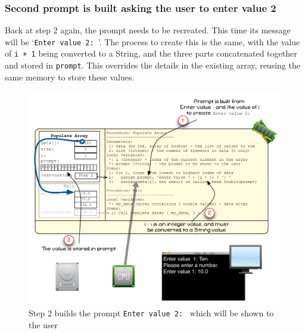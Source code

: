 
\clearpage
\subsubsection{Second prompt is built asking the user to enter value 2} %
\label{ssub:second_prompt_is_built_asking_the_user_to_enter_value_2}

Back at step 2 again, the prompt needs to be recreated. This time its message will be `\texttt{Enter value 2: }'. The process to create this is the same, with the value of \texttt{i + 1} being converted to a String, and the three parts concatenated together and stored in \texttt{prompt}. This overrides the details in the existing array, reusing the same memory to store these values.

\begin{figure}[htbp]
   \centering
   \includegraphics[width=\textwidth]{./topics/arrays/images/PopulateArray7} 
   \caption{Step 2 builds the prompt \texttt{Enter value 2: } which will be shown to the user}
   \label{fig:populate-array-vis-7}
\end{figure}


